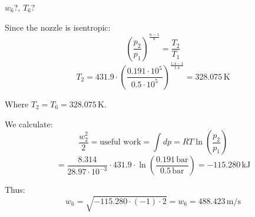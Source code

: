 \( w_6? \), \( T_6? \)  

Since the nozzle is isentropic:  
\[
\left( \frac{p_2}{p_1} \right)^{\frac{n-1}{n}} = \frac{T_2}{T_1}
\]  
\[
T_2 = 431.9 \cdot \left( \frac{0.191 \cdot 10^5}{0.5 \cdot 10^5} \right)^{\frac{1.4-1}{1.4}} = 328.075 \, \text{K}
\]  

Where \( T_2 = T_6 = 328.075 \, \text{K} \).  

We calculate:  
\[
\frac{w_2^2}{2} = \text{useful work} = \int dp = RT \ln \left( \frac{p_2}{p_1} \right)
\]  
\[
= \frac{8.314}{28.97 \cdot 10^{-3}} \cdot 431.9 \cdot \ln \left( \frac{0.191 \, \text{bar}}{0.5 \, \text{bar}} \right) = -115.280 \, \text{kJ}
\]  

Thus:  
\[
w_6 = \sqrt{-115.280 \cdot (-1) \cdot 2} = w_6 = 488.423 \, \text{m/s}
\]